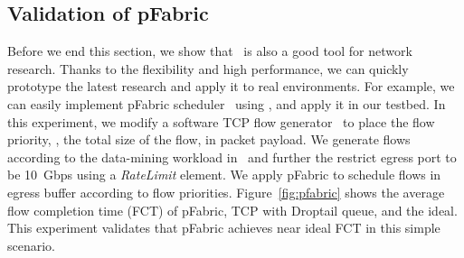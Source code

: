 \begin{table}[t!]
	\centering
	\vspace{-5pt}
	\caption{Relative area cost compared to NetFPGA.}
	\label{tab:netfpga}
\vspace{-10pt}
\end{table}


\subsection{Validation of pFabric}
Before we end this section, we show that \name\ is also a good tool for network research.
Thanks to the flexibility and high performance, we can quickly prototype the latest research 
and apply it to real environments.
For example, we can easily implement pFabric scheduler~\cite{pfabric} using \name, and 
apply it in our testbed.
%
In this experiment, we modify a software TCP flow generator~\cite{mqecn} to place the flow
priority, \ie, the total size of the flow, in packet payload.
We generate flows according to the data-mining workload in~\cite{pfabric} and further
the restrict egress port to be 10~Gbps using a \textit{RateLimit} element.
We apply pFabric to schedule flows in egress buffer according to flow priorities. 
Figure~\ref{fig:pfabric} shows the average flow completion time (FCT) of pFabric, TCP with Droptail queue, and the ideal.
This experiment validates that pFabric achieves near ideal FCT in this simple scenario.

